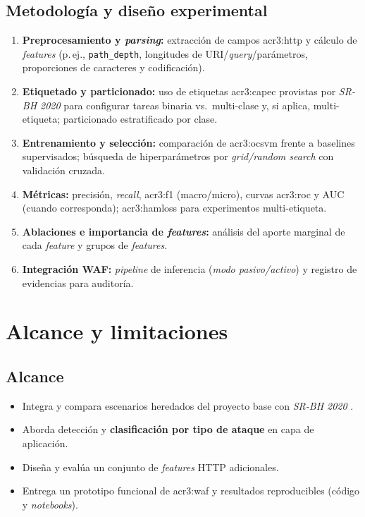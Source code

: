 \subsection*{Metodología y diseño experimental}
\begin{enumerate}
  \item \textbf{Preprocesamiento y \textit{parsing}:} extracción de campos \gls{acr3:http} y cálculo de \textit{features} (p.\,ej., \texttt{path\_depth}, longitudes de URI/\textit{query}/parámetros, proporciones de caracteres y codificación).
  \item \textbf{Etiquetado y particionado:} uso de etiquetas \gls{acr3:capec} provistas por \textit{SR-BH 2020} para configurar tareas binaria vs.\ multi-clase y, si aplica, multi-etiqueta; particionado estratificado por clase.
  \item \textbf{Entrenamiento y selección:} comparación de \gls{acr3:ocsvm} frente a baselines supervisados; búsqueda de hiperparámetros por \textit{grid/random search} con validación cruzada.
  \item \textbf{Métricas:} precisión, \textit{recall}, \gls{acr3:f1} (macro/micro), curvas \gls{acr3:roc} y AUC (cuando corresponda); \gls{acr3:hamloss} para experimentos multi-etiqueta.
  \item \textbf{Ablaciones e importancia de \textit{features}:} análisis del aporte marginal de cada \textit{feature} y grupos de \textit{features}.
  \item \textbf{Integración WAF:} \textit{pipeline} de inferencia (\emph{modo pasivo/activo}) y registro de evidencias para auditoría.
\end{enumerate}

\section{Alcance y limitaciones}

\subsection*{Alcance}
\begin{itemize}
  \item Integra y compara escenarios heredados del proyecto base con \textit{SR-BH 2020} \cite{harvard2020dataset}.
  \item Aborda detección y \textbf{clasificación por tipo de ataque} en capa de aplicación.
  \item Diseña y evalúa un conjunto de \textit{features} HTTP adicionales.
  \item Entrega un prototipo funcional de \gls{acr3:waf} y resultados reproducibles (código y \textit{notebooks}).
\end{itemize}

